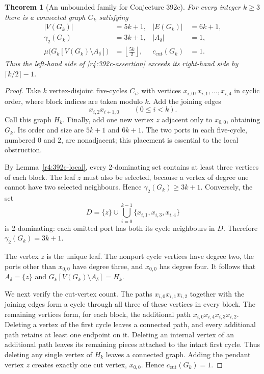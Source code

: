 \documentclass[11pt,a4paper]{article}
\newtheorem{theorem}{Theorem}[section]
\theoremstyle{remark}
\begin{document}
\begin{theorem}[An unbounded family for Conjecture 392c]
\label{r4:392c-family}
For every integer $k\ge3$ there is a connected graph $G_k$ satisfying
\begin{align*}
  |V(G_k)|&=5k+1, & |E(G_k)|&=6k+1,\\
  \gamma_2(G_k)&=3k+1, & |A_\delta|&=1,\\
  \mu\bigl(G_k[V(G_k)\setminus A_\delta]\bigr)
    &=\left\lfloor\frac{5k}{2}\right\rfloor,
  &c_{\mathrm{cut}}(G_k)&=1.
\end{align*}
Thus the left-hand side of \eqref{r4:392c-assertion} exceeds its
right-hand side by $\lceil k/2\rceil-1$.
\end{theorem}

\begin{proof}
Take $k$ vertex-disjoint five-cycles $C_i$, with vertices
$x_{i,0},x_{i,1},\ldots,x_{i,4}$ in cyclic order, where block indices are
taken modulo $k$.  Add the joining edges
\begin{equation}
  x_{i,2}x_{i+1,0}\qquad(0\le i<k).
  \label{r4:392c-joining-edges}
\end{equation}
Call this graph $H_k$.  Finally, add one new vertex $z$ adjacent only to
$x_{0,0}$, obtaining $G_k$.  Its order and size are $5k+1$ and $6k+1$.
The two ports in each five-cycle, numbered $0$ and $2$, are nonadjacent;
this placement is essential to the local obstruction.

By Lemma~\ref{r4:392c-local}, every 2-dominating set contains at least
three vertices of each block.  The leaf $z$ must also be selected,
because a vertex of degree one cannot have two selected neighbours.
Hence $\gamma_2(G_k)\ge3k+1$.  Conversely, the set
\begin{equation}
  D=\{z\}\cup
    \bigcup_{i=0}^{k-1}\{x_{i,1},x_{i,3},x_{i,4}\}
  \label{r4:392c-witness}
\end{equation}
is 2-dominating: each omitted port has both its cycle neighbours in
$D$.  Therefore $\gamma_2(G_k)=3k+1$.

The vertex $z$ is the unique leaf.  The nonport cycle vertices have
degree two, the ports other than $x_{0,0}$ have degree three, and
$x_{0,0}$ has degree four.  It follows that $A_\delta=\{z\}$ and
$G_k[V(G_k)\setminus A_\delta]=H_k$.

We next verify the cut-vertex count.  The paths
$x_{i,0}x_{i,1}x_{i,2}$ together with the joining edges form a cycle
through all three of these vertices in every block.  The remaining
vertices form, for each block, the additional path
$x_{i,0}x_{i,4}x_{i,3}x_{i,2}$.  Deleting a vertex of the first cycle
leaves a connected path, and every additional path retains at least
one endpoint on it.  Deleting an internal vertex of an additional path
leaves its remaining pieces attached to the intact first cycle.
Thus deleting any single vertex of $H_k$ leaves a connected graph.
Adding the pendant vertex $z$ creates exactly one cut vertex,
$x_{0,0}$.  Hence $c_{\mathrm{cut}}(G_k)=1$.


\end{proof}
\end{document}
